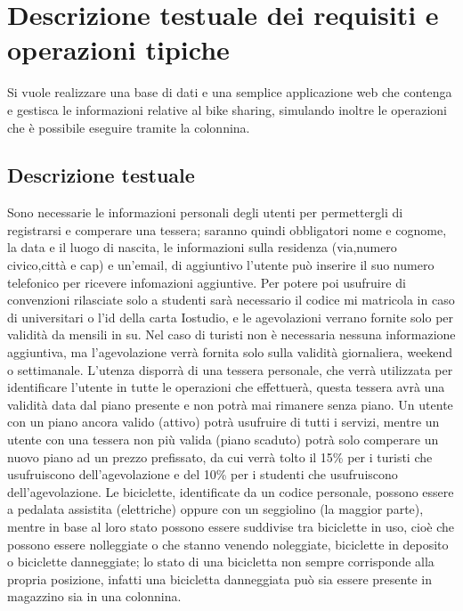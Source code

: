 \documentclass[a4paper,twoside]{article}
\begin{document}
\section{Descrizione testuale dei requisiti e operazioni tipiche}
Si vuole realizzare una base di dati e una semplice applicazione web che contenga e gestisca le informazioni relative al
bike sharing, simulando inoltre le operazioni che è possibile eseguire tramite la colonnina.

\subsection{Descrizione testuale}
Sono necessarie le informazioni personali degli utenti per permettergli di registrarsi e comperare una tessera; saranno quindi obbligatori nome e cognome, la data e il luogo di nascita, le informazioni sulla residenza (via,numero civico,città e cap) e un'email, di aggiuntivo l'utente può inserire il suo numero telefonico per ricevere infomazioni aggiuntive.\newline
Per potere poi usufruire di convenzioni rilasciate solo a studenti sarà necessario il codice mi matricola in caso di universitari o l'id della carta Iostudio, e le agevolazioni verrano fornite solo per validità da mensili in su.\newline
Nel caso di turisti non è necessaria nessuna informazione aggiuntiva, ma l'agevolazione verrà fornita solo sulla validità giornaliera, weekend o settimanale.\newline
L'utenza disporrà di una tessera personale, che verrà utilizzata per identificare l'utente in tutte le operazioni che effettuerà, questa tessera avrà una validità data dal piano presente e non potrà mai rimanere senza piano. Un utente con un piano ancora valido (attivo) potrà usufruire di tutti i servizi, mentre un utente con una tessera non più valida (piano scaduto) potrà solo comperare un nuovo piano ad un prezzo prefissato, da cui verrà tolto il 15\% per i turisti che usufruiscono dell'agevolazione e del 10\% per i studenti che usufruiscono dell'agevolazione.\newline
Le biciclette, identificate da un codice personale, possono essere a pedalata assistita (elettriche) oppure con un seggiolino (la maggior parte), mentre in base al loro stato possono essere suddivise tra biciclette in uso, cioè che possono essere nolleggiate o che stanno venendo noleggiate, biciclette in deposito o biciclette danneggiate; lo stato di una bicicletta non sempre corrisponde alla propria posizione, infatti una bicicletta danneggiata può sia essere presente in magazzino sia in una colonnina.\newline
\end{document}
